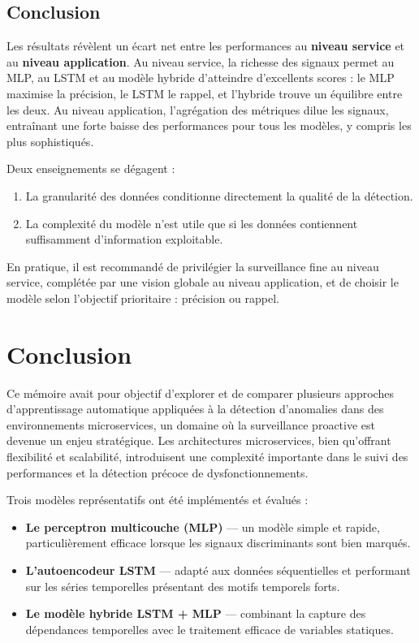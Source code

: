 \documentclass[a4paper,12pt]{report}
\begin{document}
\section*{Conclusion}
Les résultats révèlent un écart net entre les performances au \textbf{niveau service} et au \textbf{niveau application}.
Au niveau service, la richesse des signaux permet au MLP, au LSTM et au modèle hybride d’atteindre d’excellents scores :
le MLP maximise la précision, le LSTM le rappel, et l’hybride trouve un équilibre entre les deux.
Au niveau application, l’agrégation des métriques dilue les signaux, entraînant une forte baisse des performances pour tous les modèles, y compris les plus sophistiqués.

Deux enseignements se dégagent :
\begin{enumerate}
\item La granularité des données conditionne directement la qualité de la détection.
\item La complexité du modèle n’est utile que si les données contiennent suffisamment d’information exploitable.
\end{enumerate}

En pratique, il est recommandé de privilégier la surveillance fine au niveau service, complétée par une vision globale au niveau application, et de choisir le modèle selon l’objectif prioritaire : précision ou rappel.



\chapter{Conclusion}

Ce mémoire avait pour objectif d’explorer et de comparer plusieurs approches d’apprentissage automatique appliquées à la détection d’anomalies dans des environnements microservices, un domaine où la surveillance proactive est devenue un enjeu stratégique. Les architectures microservices, bien qu’offrant flexibilité et scalabilité, introduisent une complexité importante dans le suivi des performances et la détection précoce de dysfonctionnements.  

Trois modèles représentatifs ont été implémentés et évalués :
\begin{itemize}
    \item \textbf{Le perceptron multicouche (MLP)} — un modèle simple et rapide, particulièrement efficace lorsque les signaux discriminants sont bien marqués.
    \item \textbf{L’autoencodeur LSTM} — adapté aux données séquentielles et performant sur les séries temporelles présentant des motifs temporels forts.
    \item \textbf{Le modèle hybride LSTM + MLP} — combinant la capture des dépendances temporelles avec le traitement efficace de variables statiques.
\end{itemize}
\end{document}
